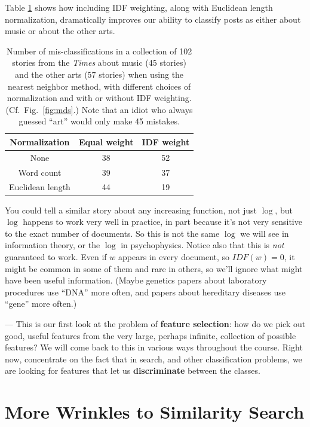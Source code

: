 \documentclass{article}
\begin{document}
Table \ref{table:idf-is-good} shows how including IDF weighting, along with
Euclidean length normalization, dramatically improves our ability to classify
posts as either about music or about the other arts.

\begin{table}
  \begin{center}
    \begin{tabular}{ccc}
      Normalization & Equal weight & IDF weight \\
      \hline
      None             & 38 & 52 \\
      Word count  & 39 & 37 \\
      Euclidean length & 44 & 19 \\
    \end{tabular}
    \caption{Number of mis-classifications in a collection of 102 stories from
      the {\em Times} about music (45 stories) and the other arts (57 stories)
      when using the nearest neighbor method, with different choices of
      normalization and with or without IDF weighting.  (Cf.\ Fig.\
      \ref{fig:mds}.)  Note that an idiot who always guessed ``art'' would only
      make 45 mistakes.}
    \label{table:idf-is-good}
  \end{center}
\end{table}

You could tell a similar story about any increasing function, not just $\log$,
but $\log$ happens to work very well in practice, in part because it's not very
sensitive to the exact number of documents.  So this is not the same $\log$ we
will see in information theory, or the $\log$ in psychophysics.  Notice also
that this is {\em not} guaranteed to work.  Even if $w$ appears in every
document, so $IDF(w) = 0$, it might be common in some of them and rare in
others, so we'll ignore what might have been useful information.  (Maybe
genetics papers about laboratory procedures use ``DNA'' more often, and papers
about hereditary diseases use ``gene'' more often.)

--- This is our first look at the problem of {\bf feature selection}: how do we
pick out good, useful features from the very large, perhaps infinite,
collection of possible features?  We will come back to this in various ways
throughout the course.  Right now, concentrate on the fact that in search,
and other classification problems, we are looking for features that let us
{\bf discriminate} between the classes.



\section{More Wrinkles to Similarity Search}
\end{document}
